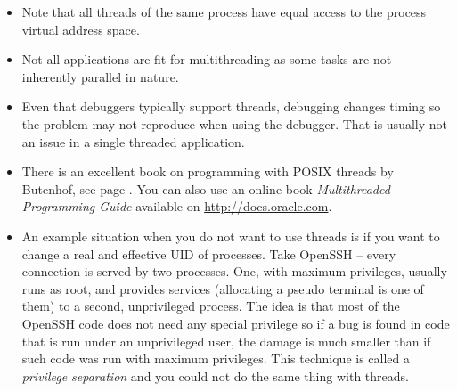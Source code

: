 \begin{itemize}
\item {}  Note that all threads of the
same process have equal access to the process virtual address space.
\item Not all applications are fit for multithreading as some tasks are not
inherently parallel in nature.
\item Even that debuggers typically support threads, debugging changes timing so
the problem may not reproduce when using the debugger.  That is usually not an
issue in a single threaded application.
\item There is an excellent book on programming with POSIX threads by Butenhof,
see page \pageref{REF_PROGRAMMING}. You can also use an online book
\emph{Multithreaded Programming Guide} available on
\url{http://docs.oracle.com}.
\item \label{PRIVILEGE_SEPARATION} An example situation when you do not want to
use threads is if you want to change a real and effective UID of processes.  Take
OpenSSH -- every connection is served by two processes.  One, with maximum
privileges, usually runs as root, and provides services (allocating a pseudo
terminal is one of them) to a second, unprivileged process.  The idea is that
most of the OpenSSH code does not need any special privilege so if a bug is
found in code that is run under an unprivileged user, the damage is much smaller
than if such code was run with maximum privileges.  This technique is called a
\emph{privilege separation} and you could not do the same thing with threads.
\end{itemize}

